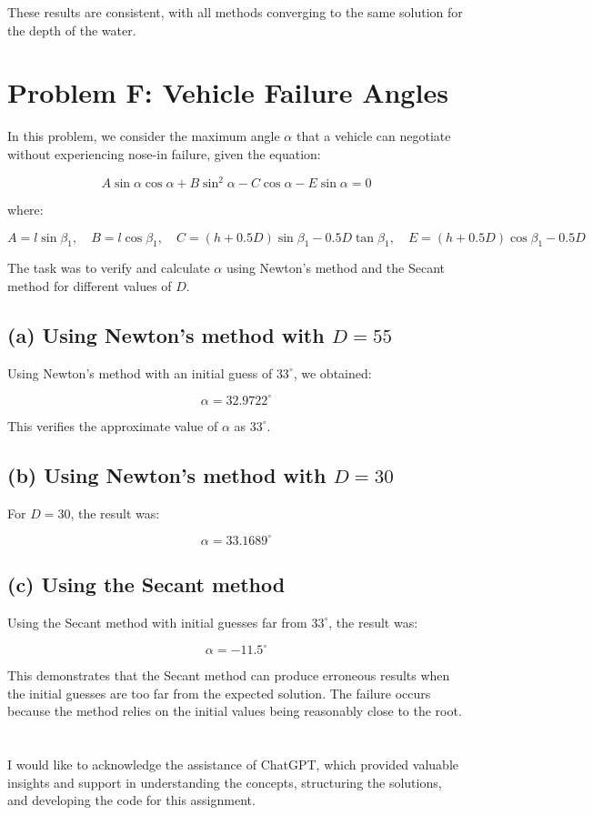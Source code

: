 \documentclass[a4paper]{article}
\begin{document}
These results are consistent, with all methods converging to the same solution for the depth of the water.

\section*{Problem F: Vehicle Failure Angles}

In this problem, we consider the maximum angle \( \alpha \) that a vehicle can negotiate without experiencing nose-in failure, given the equation:

\[
A \sin \alpha \cos \alpha + B \sin^2 \alpha - C \cos \alpha - E \sin \alpha = 0
\]

where:

\[
A = l \sin \beta_1, \quad B = l \cos \beta_1, \quad C = (h + 0.5D) \sin \beta_1 - 0.5 D \tan \beta_1, \quad E = (h + 0.5D) \cos \beta_1 - 0.5 D
\]

The task was to verify and calculate \( \alpha \) using Newton's method and the Secant method for different values of \( D \).

\subsection*{(a) Using Newton's method with \( D = 55 \)}

Using Newton's method with an initial guess of \( 33^\circ \), we obtained:

\[
\alpha = 32.9722^\circ
\]

This verifies the approximate value of \( \alpha \) as \( 33^\circ \).

\subsection*{(b) Using Newton's method with \( D = 30 \)}

For \( D = 30 \), the result was:

\[
\alpha = 33.1689^\circ
\]

\subsection*{(c) Using the Secant method}

Using the Secant method with initial guesses far from \( 33^\circ \), the result was:

\[
\alpha = -11.5^\circ
\]

This demonstrates that the Secant method can produce erroneous results when the initial guesses are too far from the expected solution. The failure occurs because the method relies on the initial values being reasonably close to the root.

\section*{}
I would like to acknowledge the assistance of ChatGPT, which provided valuable insights and support in understanding the concepts, structuring the solutions, and developing the code for this assignment. 
\end{document}
